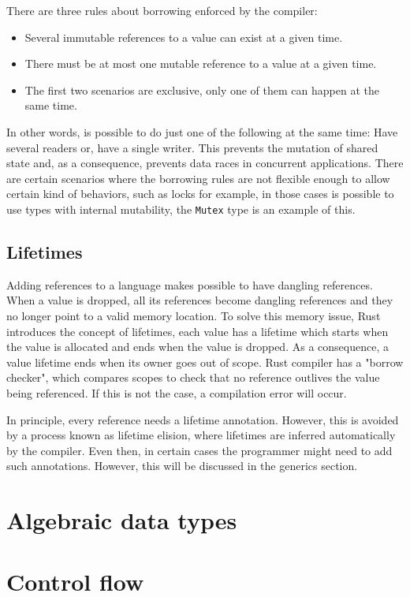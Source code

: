 There are three rules about borrowing enforced by the compiler:
\begin{itemize}
    \item Several immutable references to a value can exist at a given time.
    \item There must be at most one mutable reference to a value at a given time.
    \item The first two scenarios are exclusive, only one of them can happen at the same time.
\end{itemize}
In other words, is possible to do just one of the following at the same time: Have several readers or, have a single writer. This prevents the mutation of shared state and, as a consequence, prevents data races in concurrent applications. There are certain scenarios where the borrowing rules are not flexible enough to allow certain kind of behaviors, such as locks for example, in those cases is possible to use types with internal mutability, the \texttt{Mutex} type is an example of this.

\subsection{Lifetimes}
Adding references to a language makes possible to have dangling references. When a value is dropped, all its references become dangling references and they no longer point to a valid memory location. To solve this memory issue, Rust introduces the concept of lifetimes, each value has a lifetime which starts when the value is allocated and ends when the value is dropped. As a consequence, a value lifetime ends when its owner goes out of scope. Rust compiler has a "borrow checker", which compares scopes to check that no reference outlives the value being referenced. If this is not the case, a compilation error will occur.

In principle, every reference needs a lifetime annotation. However, this is avoided by a process known as lifetime elision, where lifetimes are inferred automatically by the compiler. Even then, in certain cases the programmer might need to add such annotations. However, this will be discussed in the generics section.

\section{Algebraic data types}
\section{Control flow}
